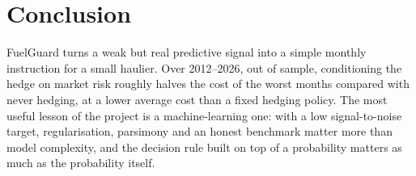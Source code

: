 \section{Conclusion}

FuelGuard turns a weak but real predictive signal into a simple monthly instruction for a small haulier.
Over 2012--2026, out of sample, conditioning the hedge on market risk roughly halves the cost of the worst
months compared with never hedging, at a lower average cost than a fixed hedging policy. The most useful
lesson of the project is a machine-learning one: with a low signal-to-noise target, regularisation,
parsimony and an honest benchmark matter more than model complexity, and the decision rule built on top of a
probability matters as much as the probability itself.
